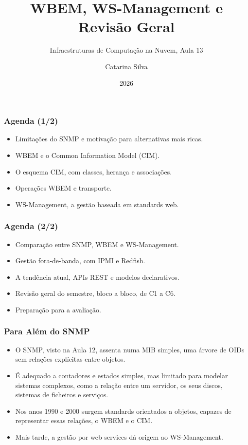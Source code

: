 \documentclass[aspectratio=169]{beamer}
\title{WBEM, WS-Management e Revisão Geral}
\subtitle{Infraestruturas de Computação na Nuvem, Aula 13}
\author{Catarina Silva}
\institute{ESTGA, Universidade de Aveiro}
\date{2026}
\begin{document}
\begin{frame}[plain]
  \titlepage
\end{frame}

\begin{frame}
\frametitle{Agenda \textcolor{NudeTaupe}{\small(1/2)}}
\begin{itemize}
    \setlength\itemsep{0.4cm}
    \item Limitações do SNMP e motivação para alternativas mais ricas.
    \item WBEM e o Common Information Model (CIM).
    \item O esquema CIM, com classes, herança e associações.
    \item Operações WBEM e transporte.
    \item WS-Management, a gestão baseada em standards web.
\end{itemize}
\end{frame}

\begin{frame}
\frametitle{Agenda \textcolor{NudeTaupe}{\small(2/2)}}
\begin{itemize}
    \setlength\itemsep{0.4cm}
    \item Comparação entre SNMP, WBEM e WS-Management.
    \item Gestão fora-de-banda, com IPMI e Redfish.
    \item A tendência atual, APIs REST e modelos declarativos.
    \item Revisão geral do semestre, bloco a bloco, de C1 a C6.
    \item Preparação para a avaliação.
\end{itemize}
\end{frame}

\begin{frame}
\frametitle{Para Além do SNMP}
\begin{itemize}
    \setlength\itemsep{0.4cm}
    \item O SNMP, visto na Aula 12, assenta numa MIB simples, uma árvore de OIDs sem relações explícitas entre objetos.
    \item É adequado a contadores e estados simples, mas limitado para modelar sistemas complexos, como a relação entre um servidor, os seus discos, sistemas de ficheiros e serviços.
    \item Nos anos 1990 e 2000 surgem standards orientados a objetos, capazes de representar essas relações, o WBEM e o CIM.
    \item Mais tarde, a gestão por web services dá origem ao WS-Management.
\end{itemize}
\end{frame}
\end{document}
